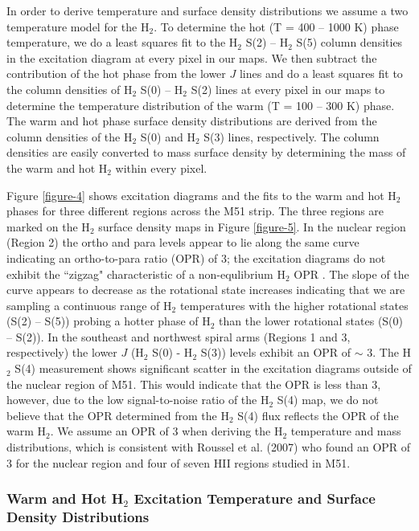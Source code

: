 \documentclass[12pt,preprint]{aastex}
\begin{document}
In order to derive temperature and surface density 
distributions we assume a two temperature model for the 
H$_2$.  To determine the hot (T = 400 -- 1000 K) 
phase temperature, we do a least squares fit 
to the H$_2$ S(2) -- H$_2$ S(5) column densities in the 
excitation diagram at every pixel in our maps.   
We then subtract the contribution of the hot phase from the lower $J$ 
lines and do a least squares fit to the column densities of 
H$_2$ S(0) -- H$_2$ S(2) lines at every pixel in our 
maps to determine the temperature distribution 
of the warm (T = 100 -- 300 K) phase.  The warm and hot 
phase surface density distributions are derived from the 
column densities of the H$_2$ S(0) and H$_2$ S(3) lines, 
respectively.  The column densities are easily converted 
to mass surface density by determining the mass of the 
warm and hot H$_2$ within every pixel. 

Figure \ref{figure-4} shows excitation diagrams and the 
fits to the warm and hot H$_2$ phases for three
different regions across the M51 strip.  The three 
regions are marked on the H$_2$ surface density 
maps in Figure \ref{figure-5}.  In the nuclear region 
(Region 2) the ortho and para levels appear to lie along the 
same curve indicating an ortho-to-para ratio (OPR) of 3; 
the excitation diagrams do not exhibit the ``zigzag" characteristic of a 
non-equlibrium H$_2$ OPR \citep{neu98, fue99}.  The 
slope of the curve appears to decrease as the rotational 
state increases indicating that we are sampling a continuous 
range of H$_2$ temperatures with the higher rotational 
states (S(2) -- S(5)) probing a hotter phase of H$_2$ 
than the lower rotational states (S(0) -- S(2)).  In the 
southeast and northwest spiral arms (Regions 1 and 
3, respectively) the lower $J$ (H$_2$ S(0) - 
H$_2$ S(3)) levels exhibit an OPR of $\sim$ 3.  The 
H$_2$ S(4) measurement shows significant 
scatter in the excitation diagrams outside of the nuclear 
region of M51.  This would indicate that the OPR is 
less than 3, however, due to the low signal-to-noise 
ratio of the H$_2$ S(4) map, we do not 
believe that the OPR determined from the H$_2$ 
S(4) flux reflects the OPR of the warm H$_2$. 
We assume an OPR of 3 when deriving the H$_2$ 
temperature and mass distributions, which is consistent 
with Roussel et al. (2007) who found an OPR of 3  for the 
nuclear region and four of seven HII regions studied in M51.

\subsubsection{Warm and Hot H$_2$ Excitation Temperature and Surface Density Distributions}
\end{document}
